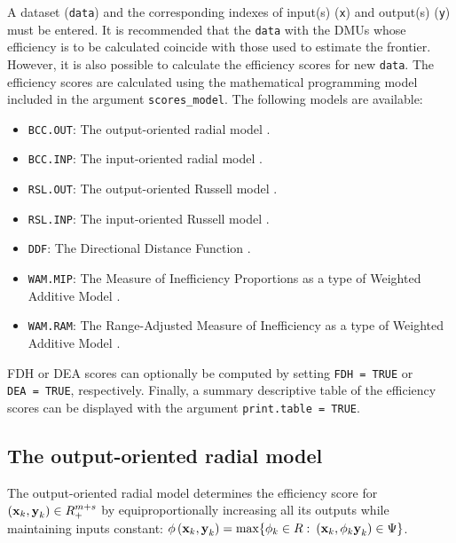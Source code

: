 A dataset (\texttt{data}) and the corresponding indexes of input(s)
(\texttt{x}) and output(s) (\texttt{y}) must be entered. It is
recommended that the \texttt{data} with the DMUs whose efficiency is to
be calculated coincide with those used to estimate the frontier.
However, it is also possible to calculate the efficiency scores for new
\texttt{data}. The efficiency scores are calculated using the
mathematical programming model included in the argument
\texttt{scores\_model}. The following models are available:

\begin{itemize}
\item
  \texttt{BCC.OUT}: The output-oriented radial model \citep{banker1984}.
\item
  \texttt{BCC.INP}: The input-oriented radial model \citep{banker1984}.
\item
  \texttt{RSL.OUT}: The output-oriented Russell model \citep{fare1978}.
\item
  \texttt{RSL.INP}: The input-oriented Russell model \citep{fare1978}.
\item
  \texttt{DDF}: The Directional Distance Function \citep{chambers1998}.
\item
  \texttt{WAM.MIP}: The Measure of Inefficiency Proportions as a type of
  Weighted Additive Model \citep{lovell1995}.
\item
  \texttt{WAM.RAM}: The Range-Adjusted Measure of Inefficiency as a type
  of Weighted Additive Model \citep{lovell1995, cooper1999}.
\end{itemize}

FDH or DEA scores can optionally be computed by setting
\texttt{FDH\ =\ TRUE} or \texttt{DEA\ =\ TRUE}, respectively. Finally, a
summary descriptive table of the efficiency scores can be displayed with
the argument \texttt{print.table\ =\ TRUE}.

\hypertarget{the-output-oriented-radial-model}{%
\subsection{The output-oriented radial
model}\label{the-output-oriented-radial-model}}

The output-oriented radial model determines the efficiency score for
\(\left({\it \textbf{x}}_{k} ,{\it \textbf{y}}_{k} \right)\in R_{+}^{m+s}\)
by equiproportionally increasing all its outputs while maintaining
inputs constant:
\(\phi \left({\it \textbf{x}}_{k}, {\it \textbf{y}}_{k} \right)=\max \{\phi _{k} \in R:\)
\(\left({\it \textbf{x}}_{k} ,\phi_{k} {\it \textbf{y}}_{k} \right)\in \Psi \}\).

